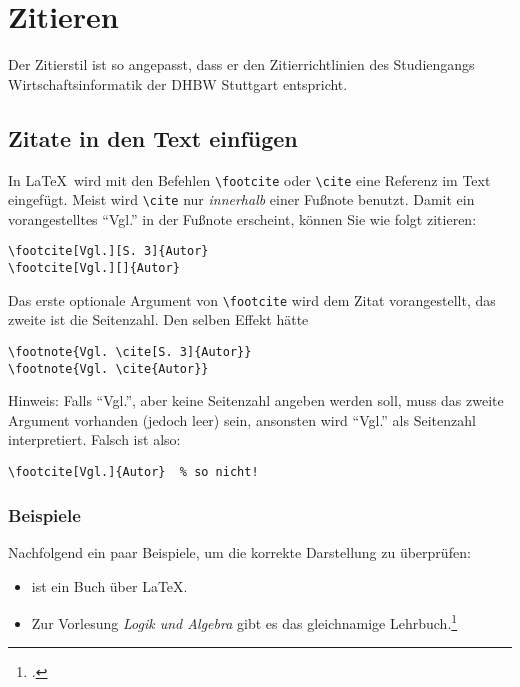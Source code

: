 \chapter{Zitieren}\label{chapter:zitate}

Der Zitierstil ist so angepasst, dass er den Zitierrichtlinien des Studiengangs Wirtschaftsinformatik der DHBW Stuttgart entspricht. 

\section{Zitate in den Text einfügen}
In \LaTeX\ wird mit den Befehlen \verb|\footcite| 
oder 
\verb|\cite|
eine Referenz im Text eingefügt. Meist wird \verb|\cite| nur \emph{innerhalb} einer Fußnote benutzt. 
Damit ein vorangestelltes \enquote{Vgl.} in der Fußnote erscheint, können Sie wie folgt zitieren:
\begin{verbatim}
\footcite[Vgl.][S. 3]{Autor}
\footcite[Vgl.][]{Autor}
\end{verbatim}

Das erste optionale Argument von \verb|\footcite| wird dem Zitat vorangestellt, das zweite ist die Seitenzahl. Den selben Effekt hätte
\begin{verbatim}
\footnote{Vgl. \cite[S. 3]{Autor}}
\footnote{Vgl. \cite{Autor}}
\end{verbatim}

Hinweis: Falls \enquote{Vgl.}, aber keine Seitenzahl angeben werden soll, muss das zweite Argument vorhanden (jedoch leer) sein, ansonsten wird \enquote{Vgl.} als Seitenzahl interpretiert. Falsch ist also: 
\begin{verbatim}
\footcite[Vgl.]{Autor}  % so nicht!
\end{verbatim}



\subsection{Beispiele}
Nachfolgend ein paar Beispiele, um die korrekte Darstellung zu überprüfen:

\begin{itemize}
\item \cite{chaniotis_is_2015} ist ein Buch über \LaTeX.
\item Zur Vorlesung \emph{Logik und Algebra} gibt es das gleichnamige Lehrbuch.\footcite{Staab}
\end{itemize}

